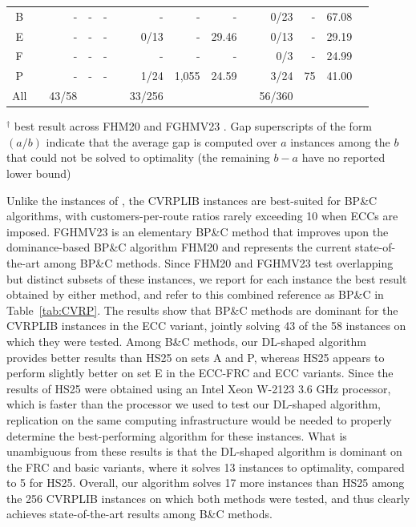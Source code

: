 \documentclass{article}
\newcommand{\rev}[1]{{\color{black}#1}}
\begin{document}
\begin{table}[htbp]
\begin{tabular*}{\textwidth}{@{\extracolsep{\fill}}ccrrrrrrrrrrrr}
    B & & - & - & - & & - & - & - & & 0/23 & - & 67.08 \\
    E & & - & - & - & & 0/13 & - & 29.46 & & 0/13 & - & 29.19 \\
    F & & - & - & - & & - & - & - & & 0/3 & - & 24.99 \\
    P & & - & - & - & & 1/24 & 1,055 & 24.59 & & 3/24 & 75 & 41.00 \\ \hline
    All & & \rev{43/58} & & & & 33/256 & & & & 56/360 & & \\ \hline
    \end{tabular*}
    \par\smallskip
    \begin{minipage}{\textwidth}
    \raggedright
    \small \rev{$^\dagger$ best result across FHM20 \citep{florio2020new} and FGHMV23 \citep{florio2023recent}. Gap superscripts of the form $(a/b)$ indicate that the average gap is computed over $a$ instances among the $b$ that could not be solved to optimality (the remaining $b-a$ have no reported lower bound)}
    \end{minipage}
\end{table}

Unlike the instances of \cite{louveaux2018exact}, the CVRPLIB instances are best-suited for BP\&C algorithms, with customers-per-route ratios rarely exceeding 10 when ECCs are imposed. \rev{FGHMV23 is an elementary BP\&C method that improves upon the dominance-based BP\&C algorithm FHM20 and represents the current state-of-the-art among BP\&C methods. Since FHM20 and FGHMV23 test overlapping but distinct subsets of these instances, we report for each instance the best result obtained by either method, and refer to this combined reference as BP\&C in Table~\ref{tab:CVRP}. The results show that BP\&C methods are dominant for the CVRPLIB instances in the ECC variant, jointly solving 43 of the 58 instances on which they were tested.} Among B\&C methods, our DL-shaped algorithm provides better results than HS25 on sets A and P, whereas HS25 appears to perform slightly better on set E in the ECC-FRC and ECC variants. Since the results of HS25 were obtained using an Intel Xeon W-2123 3.6 GHz processor, which is faster than the processor we used to test our DL-shaped algorithm, replication on the same computing infrastructure would be needed to properly determine the best-performing algorithm for these instances. What is unambiguous from these results is that the DL-shaped algorithm is dominant on the FRC and basic variants, where it solves 13 instances to optimality, compared to 5 for HS25. Overall, our algorithm solves 17 more instances than HS25 among the 256 CVRPLIB instances on which both methods were tested, and thus clearly achieves state-of-the-art results among B\&C methods.
\end{document}
